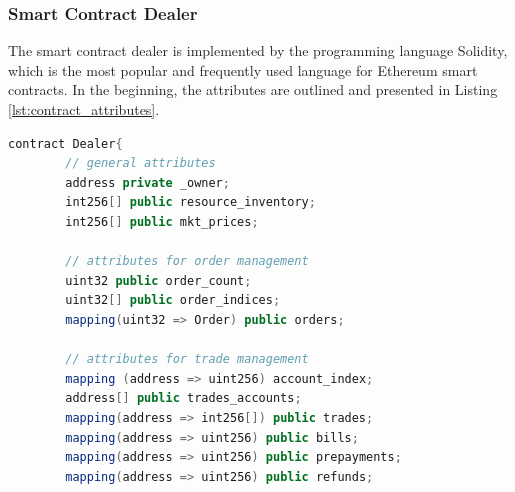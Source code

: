 \subsubsection{Smart Contract Dealer}
\label{sec:smart_contract_dealer}
The smart contract dealer is implemented by the programming language Solidity, which is the most popular and frequently 
used language for Ethereum smart contracts. In the beginning, the attributes are outlined and presented in Listing 
\ref{lst:contract_attributes}.

\begin{lstlisting}[float=htbp, label=lst:contract_attributes, caption=Attributes of Smart Contract Dealer, language=Java]
    contract Dealer{
        // general attributes
        address private _owner;
        int256[] public resource_inventory;
        int256[] public mkt_prices;

        // attributes for order management
        uint32 public order_count;
        uint32[] public order_indices;
        mapping(uint32 => Order) public orders;

        // attributes for trade management
        mapping (address => uint256) account_index; 
        address[] public trades_accounts;
        mapping(address => int256[]) public trades;
        mapping(address => uint256) public bills;
        mapping(address => uint256) public prepayments;
        mapping(address => uint256) public refunds;
\end{lstlisting}

